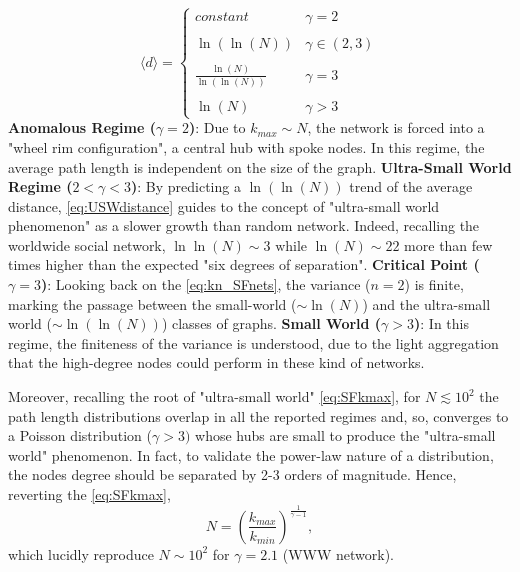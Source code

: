 \documentclass[a4paper,10pt,twoside]{book} %
\theoremstyle{definition}
\begin{document}
\begin{equation}
	\langle d \rangle = 
	\begin{cases}
		constant & \gamma = 2 \\ \\
		\ln(\ln(N)) & \gamma \in (2,3) \\ \\
		\frac{\ln(N)}{\ln(\ln(N))} & \gamma = 3 \\ \\
		\ln(N) & \gamma > 3
	\end{cases}
	\label{eq:USWdistance}
\end{equation}
\newline
\textbf{Anomalous Regime ($\gamma = 2$)}: Due to $k_{max} \sim N$, the network is forced into a "wheel rim configuration", a central hub with spoke nodes. In this regime, the average path length is independent on the size of the graph.
\newline
\textbf{Ultra-Small World Regime ($2 < \gamma < 3$)}: By predicting a $\ln(\ln(N))$ trend of the average distance, \autoref{eq:USWdistance} guides to the concept of "ultra-small world phenomenon" as a slower growth than random network. Indeed, recalling the worldwide social network, \(\ln\ln(N) \sim 3 \text{ while } \ln(N) \sim 22\) more than few times higher than the expected "six degrees of separation".
\newline
\textbf{Critical Point ($\gamma = 3$)}: Looking back on the \autoref{eq:kn_SFnets}, the variance ($n=2$) is finite, marking the passage between the small-world ($\sim \ln(N)$) and the ultra-small world ($\sim \ln(\ln(N))$) classes of graphs.
\newline
\textbf{Small World ($\gamma > 3$)}:
In this regime, the finiteness of the variance is understood, due to the light aggregation that the high-degree nodes could perform in these kind of networks.

Moreover, recalling the root of "ultra-small world" \autoref{eq:SFkmax}, for $N \lesssim 10^2$ the path length distributions overlap in all the reported regimes and, so, converges to a Poisson distribution ($\gamma > 3)$ whose hubs are small to produce the "ultra-small world" phenomenon. In fact, to validate the power-law nature of a distribution, the nodes degree should be separated by 2-3 orders of magnitude. Hence, reverting the \autoref{eq:SFkmax},
\[N = \left(\frac{k_{max}}{k_{min}} \right)^\frac{1}{\gamma -1},\]
which lucidly reproduce $N \sim 10^2$ for $\gamma = 2.1$ (WWW network).
\end{document}
